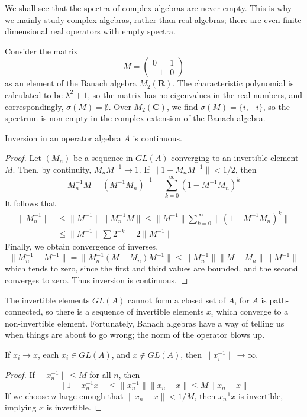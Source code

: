 We shall see that the spectra of complex algebras are never empty. This is why we mainly study complex algebras, rather than real algebras; there are even finite dimensional real operators with empty spectra.

\begin{example}
    Consider the matrix
    \[ M = \begin{pmatrix} 0 & 1 \\ -1 & 0 \end{pmatrix} \]
    as an element of the Banach algebra $M_2(\mathbf{R})$. The characteristic polynomial is calculated to be $\lambda^2 + 1$, so the matrix has no eigenvalues in the real numbers, and correspondingly, $\sigma(M) = \emptyset$. Over $M_2(\mathbf{C})$, we find $\sigma(M) = \{ i, -i \}$, so the spectrum is non-empty in the complex extension of the Banach algebra.
\end{example}

\begin{lemma}
    Inversion in an operator algebra $A$ is continuous.
\end{lemma}
\begin{proof}
    Let $(M_n)$ be a sequence in $GL(A)$ converging to an invertible element $M$. Then, by continuity, $M_nM^{-1} \to 1$. If $\| 1 - M_n M^{-1} \| < 1/2$, then
    \[ M_n^{-1} M = (M^{-1}M_n)^{-1} = \sum_{k = 0}^\infty (1 - M^{-1}M_n)^k \]
    It follows that
    \begin{align*}
        \| M_n^{-1} \| &\leq \| M^{-1} \| \| M_n^{-1} M \| \leq \| M^{-1} \| \sum_{k = 0}^\infty \| (1 - M^{-1} M_n)^k \|\\
        &\leq \| M^{-1} \| \sum 2^{-k} = 2 \| M^{-1} \|
    \end{align*}
    Finally, we obtain convergence of inverses,
    \[ \| M_n^{-1} - M^{-1} \| = \| M_n^{-1} (M - M_n) M^{-1} \| \leq \| M_n^{-1} \| \| M - M_n \| \| M^{-1} \| \]
    which tends to zero, since the first and third values are bounded, and the second converges to zero. Thus inversion is continuous.
\end{proof}

The invertible elements $GL(A)$ cannot form a closed set of $A$, for $A$ is path-connected, so there is a sequence of invertible elements $x_i$ which converge to a non-invertible element. Fortunately, Banach algebras have a way of telling us when things are about to go wrong; the norm of the operator blows up.

\begin{lemma}
    If $x_i \to x$, each $x_i \in GL(A)$, and $x \not \in GL(A)$, then $\| x_i^{-1} \| \to \infty$.
\end{lemma}
\begin{proof}
    If $\| x_n^{-1} \| \leq M$ for all $n$, then
    \[ \| 1 - x_n^{-1} x \| \leq \| x_n^{-1} \| \| x_n - x \| \leq M \| x_n - x \| \]
    If we choose $n$ large enough that $\| x_n - x \| < 1/M$, then $x_n^{-1} x$ is invertible, implying $x$ is invertible.
\end{proof}

